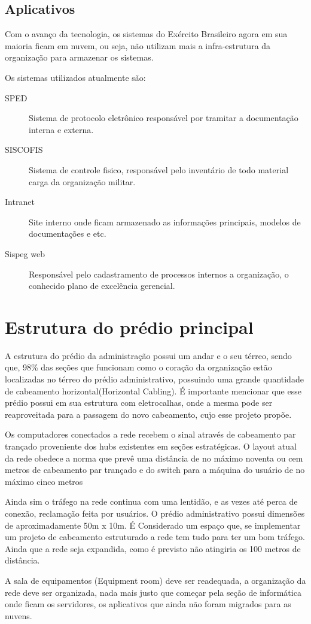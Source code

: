 \documentclass[12pt, a4paper]{article}
\begin{document}
	\subsection{Aplicativos}
	Com o avanço da tecnologia, os sistemas do Exército Brasileiro agora em sua maioria ficam em nuvem, ou seja, não utilizam mais a infra-estrutura da organização para armazenar os sistemas.
	\par 
	Os sistemas utilizados atualmente são:
	\begin{description}
		\item[SPED] Sistema de protocolo eletrônico responsável por tramitar a documentação interna e externa.
		\item[SISCOFIS] Sistema de controle fisico, responsável pelo inventário de todo material carga da organização militar.
		\item[Intranet] Site interno onde ficam armazenado as informações principais, modelos de documentações e etc.
		\item[Sispeg web] Responsável pelo cadastramento de processos internos a organização, o conhecido plano de excelência gerencial.
	\end{description}
	
	\section{Estrutura do prédio principal}
	\par 
	A estrutura do prédio da administração possui um andar e o seu térreo, sendo que, 98\% das seções que funcionam como o coração da organização estão localizadas no térreo do prédio administrativo, possuindo uma grande quantidade de cabeamento horizontal(Horizontal Cabling). É importante mencionar que esse prédio possui em sua estrutura com eletrocalhas, onde a mesma pode ser reaproveitada para a passagem do novo cabeamento, cujo esse projeto propõe.
	\par 
	Os computadores conectados a rede recebem o sinal através de cabeamento par trançado proveniente dos hubs existentes em seções estratégicas. O layout atual da rede obedece a norma que prevê uma distância de no máximo noventa ou cem metros de cabeamento par trançado e do switch para a máquina do usuário de no máximo cinco metros
	\par 
	Ainda sim o tráfego na rede continua com uma lentidão, e as vezes até perca de conexão, reclamação feita por usuários. O prédio administrativo possui dimensões de aproximadamente 50m x 10m. É Considerado um espaço que, se implementar um projeto de cabeamento estruturado a rede tem tudo para ter um bom tráfego. Ainda que a rede seja expandida, como é previsto não atingiria os 100 metros de distância.
	\par 
	A sala de equipamentos (Equipment room) deve ser readequada, a organização da rede deve ser organizada, nada mais justo que começar pela seção de informática onde ficam os servidores, os aplicativos que ainda não foram migrados para as nuvens.
\end{document}

